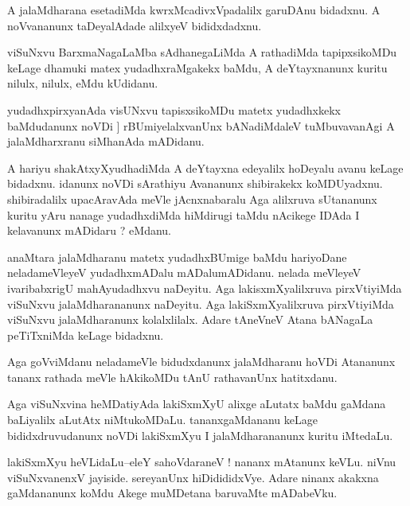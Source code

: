 \documentclass{article}
\begin{document}
\begin{mn}%
A jalaMdharana esetadiMda kwrxMcadivxVpadalilx garuDAnu bidadxnu. A noVvananunx taDeyalAdade 
alilxyeV bididxdadxnu.
\end{mn}

\begin{mn}%
viSuNxvu BarxmaNagaLaMba sAdhanegaLiMda A rathadiMda tapipxsikoMDu keLage dhamuki matex 
yudadhxraMgakekx baMdu, A deYtayxnanunx kuritu nilulx, nilulx, eMdu kUdidanu.
\end{mn}

\begin{mn}%
yudadhxpirxyanAda visUNxvu tapisxsikoMDu matetx yudadhxkekx baMdudanunx noVDi ]
rBUmiyelalxvanUnx bANadiMdaleV tuMbuvavanAgi A jalaMdharxranu siMhanAda mADidanu.
\end{mn}

\begin{mn}%
A hariyu shakAtxyXyudhadiMda A deYtayxna edeyalilx hoDeyalu avanu keLage bidadxnu. idanunx 
noVDi sArathiyu Avananunx shibirakekx koMDUyadxnu. shibiradalilx upacAravAda meVle 
jAcnxnabaralu Aga alilxruva sUtananunx kuritu yAru nanage yudadhxdiMda hiMdirugi taMdu 
nAcikege IDAda I kelavanunx mADidaru ? eMdanu.
\end{mn}

\begin{mn}%
anaMtara jalaMdharanu matetx yudadhxBUmige baMdu hariyoDane neladameVleyeV yudadhxmADalu 
mADalumADidanu. nelada meVleyeV ivaribabxrigU mahAyudadhxvu naDeyitu. Aga 
lakisxmXyalilxruva pirxVtiyiMda viSuNxvu jalaMdharananunx naDeyitu. Aga lakiSxmXyalilxruva 
pirxVtiyiMda viSuNxvu jalaMdharanunx kolalxlilalx. Adare tAneVneV Atana bANagaLa 
peTiTxniMda keLage bidadxnu.
\end{mn}

\begin{mn}%
Aga goVviMdanu neladameVle bidudxdanunx jalaMdharanu hoVDi Atananunx tananx rathada meVle 
hAkikoMDu tAnU rathavanUnx hatitxdanu.
\end{mn}

\begin{mn}%
Aga viSuNxvina heMDatiyAda lakiSxmXyU alixge aLutatx baMdu gaMdana baLiyalilx aLutAtx 
niMtukoMDaLu. tananxgaMdananu keLage bididxdruvudanunx noVDi lakiSxmXyu I jalaMdharananunx 
kuritu iMtedaLu.
\end{mn}

\begin{mn}%
lakiSxmXyu heVLidaLu--eleY sahoVdaraneV ! nananx mAtanunx keVLu. niVnu viSuNxvanenxV 
jayiside. sereyanUnx hiDidididxVye. Adare ninanx akakxna gaMdananunx koMdu Akege muMDetana 
baruvaMte mADabeVku.
\end{mn}
\end{document}
